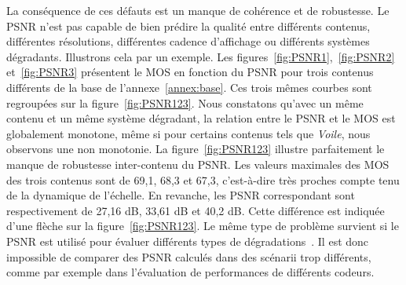 La conséquence de ces défauts est un manque de cohérence et de robustesse. Le PSNR n'est pas capable de bien prédire la qualité entre différents contenus, différentes résolutions, différentes cadence d'affichage ou différents systèmes dégradants. Illustrons cela par un exemple. Les figures~\ref{fig:PSNR1},~\ref{fig:PSNR2} et~\ref{fig:PSNR3} présentent le MOS en fonction du PSNR pour trois contenus différents de la base de l'annexe~\ref{annex:base}. Ces trois mêmes courbes sont regroupées sur la figure~\ref{fig:PSNR123}. Nous constatons qu'avec un même contenu et un même système dégradant, la relation entre le PSNR et le MOS est globalement monotone, même si pour certains contenus tels que \emph{Voile}, nous observons une non monotonie. La figure~\ref{fig:PSNR123} illustre parfaitement le manque de robustesse inter-contenu du PSNR. Les valeurs maximales des MOS des trois contenus sont de 69,1, 68,3 et 67,3, c'est-à-dire très proches compte tenu de la dynamique de l'échelle. En revanche, les PSNR correspondant sont respectivement de 27,16 dB, 33,61 dB et 40,2 dB. Cette différence est indiquée d'une flèche sur la figure~\ref{fig:PSNR123}. Le même type de problème survient si le PSNR est utilisé pour évaluer différents types de dégradations~\cite{ebrahimi-spie2004}. Il est donc impossible de comparer des PSNR calculés dans des scénarii trop différents, comme par exemple dans l'évaluation de performances de différents codeurs.

